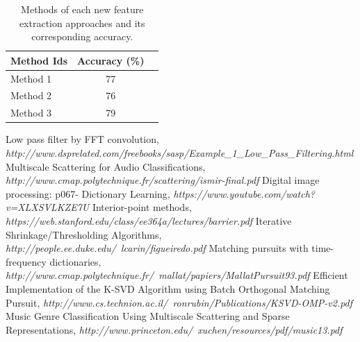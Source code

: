 \documentclass[final]{siamltexmm}
\begin{document}
\begin{table}[h!]
\centering
\begin{tabular}{ l || c | r }
      \hline
      Method Ids & Accuracy (\%) \\ \hline \hline
      Method 1 & 77 \\ \hline
      Method 2 & 76 \\ \hline
      Method 3 & 79 \\ \hline
      \hline
    \end{tabular}
\caption{Methods of each new feature extraction approaches and its corresponding accuracy.}
\label{table:1}
\end{table}

\begin{thebibliography}{10}
 {\sc Low pass filter by FFT convolution}, {\em http://www.dsprelated.com/freebooks/sasp/Example\_1\_Low\_Pass\_Filtering.html}
 {\sc Multiscale Scattering for Audio Classifications}, {\em http://www.cmap.polytechnique.fr/scattering/ismir-final.pdf}
 {\sc Digital image processing: p067- Dictionary Learning}, {\em https://www.youtube.com/watch?v=XLXSVLKZE7U}
 {\sc Interior-point methods}, {\em https://web.stanford.edu/class/ee364a/lectures/barrier.pdf}
 {\sc Iterative Shrinkage/Thresholding Algorithms}, {\em http://people.ee.duke.edu/~lcarin/figueiredo.pdf}
 {\sc Matching pursuits with time-frequency dictionaries}, {\em http://www.cmap.polytechnique.fr/~mallat/papiers/MallatPursuit93.pdf}
 {\sc Efficient Implementation of the K-SVD Algorithm using Batch Orthogonal Matching Pursuit}, {\em http://www.cs.technion.ac.il/~ronrubin/Publications/KSVD-OMP-v2.pdf}
 {\sc Music Genre Classification Using Multiscale Scattering and Sparse Representations}, {\em http://www.princeton.edu/~xuchen/resources/pdf/music13.pdf}
\end{thebibliography}
\end{document}
